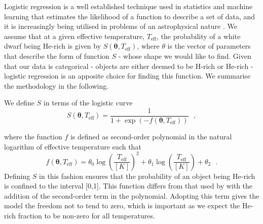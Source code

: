 \documentclass[a4paper,fleqn,usenatbib]{mnras}
\begin{document}
Logistic regression is a well established technique used in statistics and machine learning that estimates the likelihood of a function to describe a set of data, and it is increasingly being utilised in problems of an astrophysical nature \citep{hollands18b,chromey19}.
We assume that at a given effective temperature, $T_{\mathrm{eff}}$, the probability of a white dwarf being He-rich is given by $S(\bm{\theta}, T_{\mathrm{eff}})$, where $\theta$ is the vector of parameters that describe the form of function $S$ - whose shape we would like to find. Given that our data is categorical - objects are either deemed to be H-rich or He-rich - logistic regression is an apposite choice for finding this function. We summarise the methodology in the following. 

We define $S$ in terms of the logistic curve
\begin{equation}
 S(\bm{\theta}, T_{\mathrm{eff}}) = \frac{1}{1+\exp(-f(\bm{\theta}, T_{\mathrm{eff}}))}~~~,
 \label{eq:logit}
\end{equation}

{\noindent}where the function $f$ is defined as second-order polynomial in the natural logarithm of effective temperature such that
\begin{equation}
 f(\bm{\theta}, T_{\mathrm{eff}}) = \theta_0 \log \left(\frac{T_{\mathrm{eff}}}{[K]}\right)^2 + \theta_1 \log \left(\frac{T_{\mathrm{eff}}}{[K]}\right) + \theta_2~~~.
\end{equation}
Defining $S$ in this fashion ensures that the probability of an object being He-rich is confined to the interval [0,1]. This function differs from that used by \citet{hollands18b} with the addition of the second-order term in the polynomial. Adopting this term gives the model the freedom not to tend to zero, which is important as we expect the He-rich fraction to be non-zero for all temperatures. 
\end{document}
